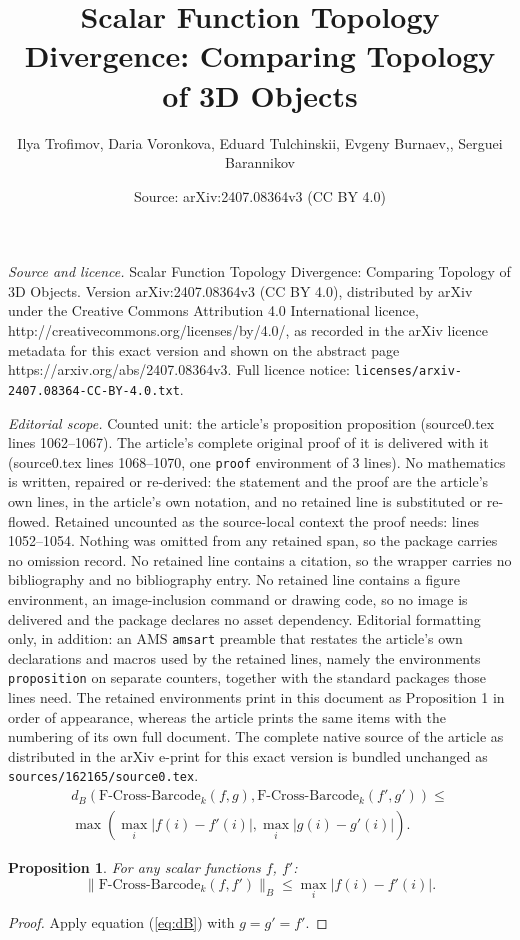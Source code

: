 \documentclass[10pt,a4paper]{amsart}
\title{Scalar Function Topology Divergence: Comparing Topology of 3D Objects}
\author{Ilya Trofimov, Daria Voronkova, Eduard Tulchinskii, Evgeny Burnaev,, Serguei Barannikov}
\date{Source: arXiv:2407.08364v3 (CC BY 4.0)}
\newtheorem{proposition}{Proposition}
\begin{document}
\maketitle

\noindent\emph{Source and licence.} Scalar Function Topology Divergence: Comparing Topology of 3D Objects. Version arXiv:2407.08364v3 (CC BY 4.0), distributed by arXiv under the Creative Commons Attribution 4.0 International licence, http://creativecommons.org/licenses/by/4.0/, as recorded in the arXiv licence metadata for this exact version and shown on the abstract page https://arxiv.org/abs/2407.08364v3. Full licence notice: \texttt{licenses/arxiv-2407.08364-CC-BY-4.0.txt}.\par\smallskip

\noindent\textit{Editorial scope.} Counted unit: the article's proposition proposition (source0.tex lines 1062--1067). The article's complete original proof of it is delivered with it (source0.tex lines 1068--1070, one \texttt{proof} environment of 3 lines). No mathematics is written, repaired or re-derived: the statement and the proof are the article's own lines, in the article's own notation, and no retained line is substituted or re-flowed.  Retained uncounted as the source-local context the proof needs: lines 1052--1054.  Nothing was omitted from any retained span, so the package carries no omission record.  No retained line contains a citation, so the wrapper carries no bibliography and no bibliography entry.  No retained line contains a figure environment, an image-inclusion command or drawing code, so no image is delivered and the package declares no asset dependency.  Editorial formatting only, in addition: an AMS \texttt{amsart} preamble that restates the article's own declarations and macros used by the retained lines, namely the environments \texttt{proposition} on separate counters, together with the standard packages those lines need.  The retained environments print in this document as Proposition 1 in order of appearance, whereas the article prints the same items with the numbering of its own full document.  The complete native source of the article as distributed in the arXiv e-print for this exact version is bundled unchanged as \texttt{sources/162165/source0.tex}.
\begin{multline}
    d_B(\text{F-Cross-Barcode} _ k(f,g), \text{F-Cross-Barcode} _ k({f}',{g}')) \leq \\ \max(\max _ {i} \lvert f(i)-{f}'(i)\rvert ,\max _ {i} \lvert g(i)-{g}'(i)\rvert ). \label{eq:dB}
\end{multline}

\begin{proposition} 
 For any scalar functions $f$, ${f}'$: 
 \vskip-0.1in
 $$\lVert \text{F-Cross-Barcode}_k(f,{f}')\rVert_B \leq \max_{i} \lvert f(i)-{f}'(i)\rvert.$$   
 \vskip-0.1in
\end{proposition}

\begin{proof}
    Apply equation (\ref{eq:dB}) with $g=g'=f'$.
\end{proof}
\end{document}
